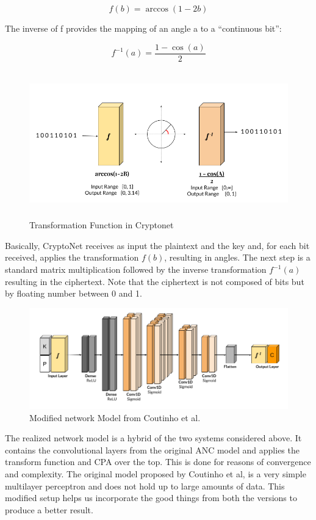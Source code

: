 \documentclass[a4paper]{article}
\begin{document}
      \[ f(b) = \arccos (1 - 2b) \]
      
      The inverse of f provides the mapping of an angle a to a “continuous bit”:
      
      \[ f^{-1}(a) = \frac{1 - \cos (a)}{2}  \]

      \begin{figure}[H]
        \centering
        \includegraphics[height=2.5in]{../ref/crnetfunc.png}
        \caption{Transformation Function in Cryptonet}
        \label{fig:crnetfunc}
      \end{figure}

      Basically, CryptoNet receives as input the plaintext and the key and, for each bit received, applies
      the transformation $f(b)$, resulting in angles. The next step is a standard matrix
      multiplication followed by the inverse transformation $f^{-1}(a)$ resulting in the
      ciphertext. Note that the ciphertext is not composed of bits but by floating number between 0 and 1.

      \begin{figure}[H]
        \centering
        \includegraphics[width=\textwidth]{../ref/crnetlayers.png}
        \caption{Modified network Model from Coutinho et al.}
        \label{fig:crnetlayers}
      \end{figure}

      The realized network model is a hybrid of the two systems considered above. It contains the
      convolutional layers from the original ANC model and applies the transform function and CPA 
      over the top. This is done for reasons of convergence and complexity.
      The original model proposed by Coutinho et al, is a very simple multilayer perceptron and does
      not hold up to large amounts of data. This modified setup helps us incorporate the good things from
      both the versions to produce a better result.
    
\end{document}

